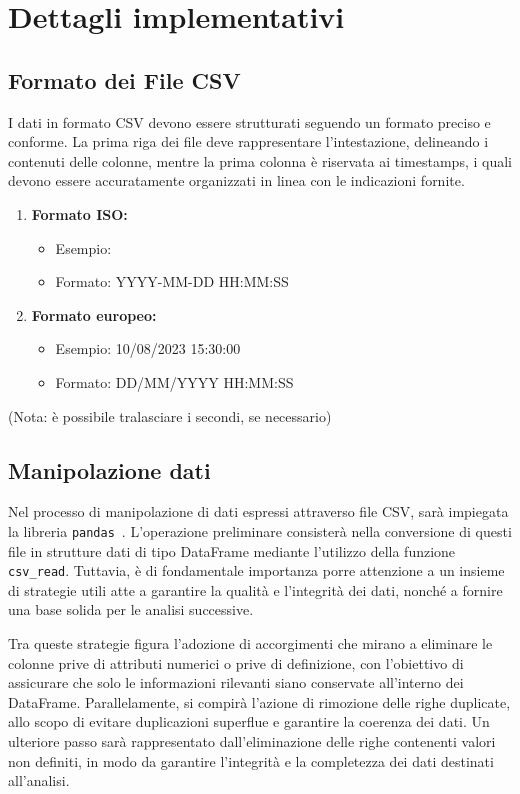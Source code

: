\documentclass{rapportECL}
\begin{document}
\chapter{Dettagli implementativi}
\label{cha:scelte}

\section{Formato dei File CSV}

I dati in formato CSV devono essere strutturati seguendo un formato preciso e conforme. 
La prima riga dei file deve rappresentare l'intestazione, delineando i contenuti delle colonne, mentre la prima colonna è riservata ai timestamps, 
i quali devono essere accuratamente organizzati in linea con le indicazioni fornite.
\begin{enumerate} 
  \item \textbf{Formato ISO:}
  \begin{itemize}
    \item Esempio:  
    \item Formato: YYYY-MM-DD HH:MM:SS
  \end{itemize}
  \item \textbf{Formato europeo:}
  \begin{itemize}
    \item Esempio: 10/08/2023 15:30:00
    \item Formato: DD/MM/YYYY HH:MM:SS
  \end{itemize} 
\end{enumerate}

(Nota: è possibile tralasciare i secondi, se necessario)

\section{Manipolazione dati}
Nel processo di manipolazione di dati espressi attraverso file CSV, sarà impiegata la libreria  \texttt{pandas}~\cite{pandas}. L'operazione preliminare 
consisterà nella conversione di questi file in strutture dati di tipo DataFrame mediante l'utilizzo della funzione  \texttt{csv\_read}. 
Tuttavia, è di fondamentale importanza porre attenzione a un insieme di strategie utili atte a garantire la qualità e l'integrità dei dati, 
nonché a fornire una base solida per le analisi successive.

Tra queste strategie figura l'adozione di accorgimenti che mirano a eliminare le colonne prive di attributi numerici o 
prive di definizione, con l'obiettivo di assicurare che solo le informazioni rilevanti siano conservate all'interno dei DataFrame. 
Parallelamente, si compirà l'azione di rimozione delle righe duplicate, allo scopo di evitare duplicazioni superflue e garantire la coerenza dei dati. 
Un ulteriore passo sarà rappresentato dall'eliminazione delle righe contenenti valori non definiti, in modo da garantire l'integrità e la completezza 
dei dati destinati all'analisi.
\end{document}
